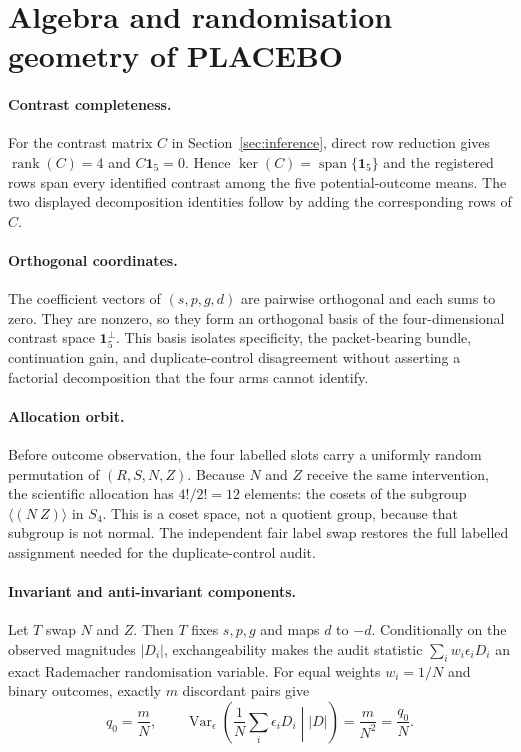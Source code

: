 \section{Algebra and randomisation geometry of PLACEBO}
\label{app:placebo-math}

\paragraph{Contrast completeness.}
For the contrast matrix $C$ in Section~\ref{sec:inference}, direct row reduction
gives $\operatorname{rank}(C)=4$ and $C\mathbf 1_5=0$. Hence
$\ker(C)=\operatorname{span}\{\mathbf 1_5\}$ and the registered rows span every
identified contrast among the five potential-outcome means. The two displayed
decomposition identities follow by adding the corresponding rows of $C$.

\paragraph{Orthogonal coordinates.}
The coefficient vectors of $(s,p,g,d)$ are pairwise orthogonal and each sums to
zero. They are nonzero, so they form an orthogonal basis of the four-dimensional
contrast space $\mathbf 1_5^\perp$. This basis isolates specificity, the
packet-bearing bundle, continuation gain, and duplicate-control disagreement
without asserting a factorial decomposition that the four arms cannot identify.

\paragraph{Allocation orbit.}
Before outcome observation, the four labelled slots carry a uniformly random
permutation of $(R,S,N,Z)$. Because $N$ and $Z$ receive the same intervention,
the scientific allocation has $4!/2!=12$ elements: the cosets of the subgroup
$\langle(N\ Z)\rangle$ in $S_4$. This is a coset space, not a quotient group,
because that subgroup is not normal. The independent fair label swap restores
the full labelled assignment needed for the duplicate-control audit.

\paragraph{Invariant and anti-invariant components.}
Let $T$ swap $N$ and $Z$. Then $T$ fixes $s,p,g$ and maps $d$ to $-d$.
Conditionally on the observed magnitudes $|D_i|$, exchangeability makes the
audit statistic $\sum_i w_i\epsilon_iD_i$ an exact Rademacher randomisation
variable. For equal weights $w_i=1/N$ and binary outcomes, exactly $m$
discordant pairs give
\[
q_0=\frac{m}{N},\qquad
\operatorname{Var}_{\epsilon}\!\left(\frac1N\sum_i\epsilon_iD_i
\middle| |D|\right)=\frac{m}{N^2}=\frac{q_0}{N}.
\]

